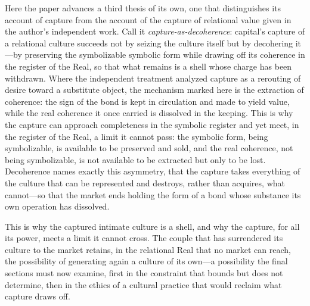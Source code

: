 Here the paper advances a third thesis of its own, one that distinguishes its account of capture from the account of the capture of relational value given in the author's independent work. Call it \emph{capture-as-decoherence}: capital's capture of a relational culture succeeds not by seizing the culture itself but by decohering it---by preserving the symbolizable symbolic form while drawing off its coherence in the register of the Real, so that what remains is a shell whose charge has been withdrawn. Where the independent treatment analyzed capture as a rerouting of desire toward a substitute object, the mechanism marked here is the extraction of coherence: the sign of the bond is kept in circulation and made to yield value, while the real coherence it once carried is dissolved in the keeping. This is why the capture can approach completeness in the symbolic register and yet meet, in the register of the Real, a limit it cannot pass: the symbolic form, being symbolizable, is available to be preserved and sold, and the real coherence, not being symbolizable, is not available to be extracted but only to be lost. Decoherence names exactly this asymmetry, that the capture takes everything of the culture that can be represented and destroys, rather than acquires, what cannot---so that the market ends holding the form of a bond whose substance its own operation has dissolved.

This is why the captured intimate culture is a shell, and why the capture, for all its power, meets a limit it cannot cross. The couple that has surrendered its culture to the market retains, in the relational Real that no market can reach, the possibility of generating again a culture of its own---a possibility the final sections must now examine, first in the constraint that bounds but does not determine, then in the ethics of a cultural practice that would reclaim what capture draws off.
